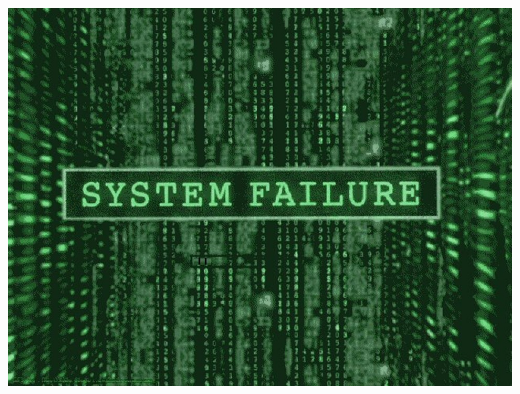 \documentclass[utf8]{beamer}
\begin{document}
	\begin{frame}
		\transdissolve
		 \includegraphics[width=1\textwidth]{failure.jpg} %
	\end{frame}
\end{document}
